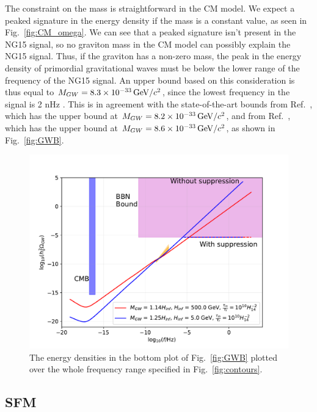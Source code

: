 \documentclass[prd,twocolumn,aps,psfig,nofootinbib,nobibnotes,superscriptaddress,preprintnumbers,times]{revtex4-2}
\newcommand{\GeV}{\,{\rm GeV}}
\begin{document}
The constraint on the mass is straightforward in the CM model. We expect a peaked signature in the energy density if the mass is a constant value, as seen in Fig.\ \ref{fig:CM_omega}. We can see that a peaked signature isn't present in the NG15 signal, so no graviton mass in the CM model can possibly explain the NG15 signal. Thus, if the graviton has a non-zero mass, the peak in the energy density of primordial gravitational waves must be below the lower range of the frequency of the NG15 signal. An upper bound based on this consideration is thus equal to $M_{GW} = 8.3\times10^{-33} \GeV/c^2$, since the lowest frequency in the signal is 2 nHz \cite{Agazie:2023}. This is in agreement with the state-of-the-art bounds from Ref.\ \cite{Wu:2023}, which has the upper bound at $M_{GW} = 8.2\times10^{-33} \GeV/c^2$, and from Ref.\ \cite{Wang:2023}, which has the upper bound at $M_{GW} = 8.6\times10^{-33} \GeV/c^2$, as shown in Fig.\ \ref{fig:GWB}.

\begin{figure}[h]
\includegraphics[width=\linewidth]{fig/fig7.pdf}
\caption{The energy densities in the bottom plot of Fig.\ \ref{fig:GWB} plotted over the whole frequency range specified in Fig.\ \ref{fig:contours}.}
\label{fig:bound}
\end{figure}

\subsection{SFM}
\end{document}
